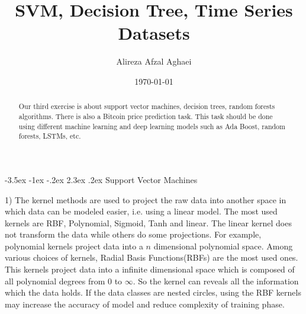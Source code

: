 \documentclass[11pt]{article}
\makeatletter
\renewcommand\section{\@startsection {section}{1}{\z@}%
                                       {-3.5ex \@plus -1ex \@minus -.2ex}%
                                       {2.3ex \@plus.2ex}%
                                       {\normalfont\fontfamily{phv}\fontsize{16}{19}\bfseries}}
\makeatother
\begin{document}
		
		\def\spacingset#1{\renewcommand{\baselinestretch}%
			{#1}\small\normalsize} \spacingset{1}
		
\title{SVM, Decision Tree, Time Series Datasets}
			\author{Alireza Afzal Aghaei}
			\date{\today}
			\maketitle
			
		\bigskip
		
	\begin{abstract}
Our third exercise is about support vector machines, decision trees, random forests algorithms. There is also a Bitcoin price prediction task. This task should be done using different machine learning and deep learning models such as Ada Boost, random forests, LSTMs, etc. 
	\end{abstract}


	\spacingset{1.5} 

\section{Support Vector Machines}

1) The kernel methods are used to project the raw data into another space in which data can be modeled easier, i.e. using a linear model. The most used kernels are RBF, Polynomial, Sigmoid, Tanh and linear. The linear kernel does not transform the data while others do some projections. For example, polynomial kernels project data into a $n$ dimensional polynomial space. Among various choices of kernels, Radial Basis Functions(RBFs) are the most used ones. This kernels project data into a infinite dimensional space which is composed of all polynomial degrees from $0$ to $\infty$. So the kernel can reveals all the information which the data holds. If the data classes are nested circles, using the RBF kernels may increase the accuracy of model and reduce complexity of training phase.
\\
\end{document}
